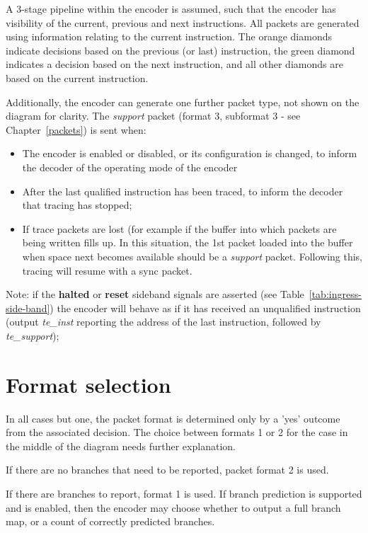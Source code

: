 A 3-stage pipeline within the encoder is assumed, such that the encoder has 
visibility of the current, previous and next instructions.  All packets are generated using 
information relating to the current instruction.  The orange diamonds indicate decisions 
based on the previous (or last) instruction, the green diamond indicates a decision based on the
next instruction, and all other diamonds are based on the current instruction.

Additionally, the encoder can generate one further packet type, not shown on the diagram for 
clarity.  The \textit{support} packet (format 3, subformat 3 - see Chapter~\ref{packets}) is 
sent when:

\begin{itemize}
  \item The encoder is enabled or disabled, or its configuration is changed, 
    to inform the decoder of the operating mode of the encoder
  \item After the last qualified instruction has been traced, to inform the decoder that 
    tracing has stopped;
  \item If trace packets are lost (for example if the buffer into which packets are being 
    written fills up.  In this situation, the 1st packet 
    loaded into the buffer when space next becomes available should be a \textit{support} 
    packet.  Following this, tracing will resume with a sync packet.
\end{itemize}

Note: if the \textbf{halted} or \textbf{reset} sideband signals are asserted (see Table~\ref{tab:ingress-side-band})
the encoder will behave as if it has received an unqualified instruction (output \textit{te\_inst}
reporting the address of the last instruction, followed by \textit{te\_support});


\section{Format selection} \label{format-selection}

In all cases but one, the packet format is determined only by a 'yes' outcome from the 
associated decision.  The choice between formats 1 or 2 for the case in the middle of the 
diagram needs further explanation.  

If there are no branches that need to be reported, packet format 2 is used.  

If there are branches to report, format 1 is used.  If branch prediction is supported and is enabled, 
then the encoder may choose whether to output a full branch map, or a count of correctly predicted branches.  

